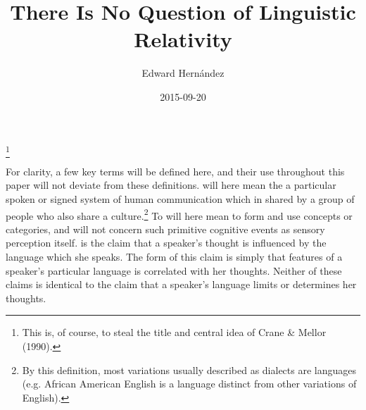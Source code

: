 \documentclass[doc,12pt]{apa6}
\newcommand\blfootnote[1]{%
  \begingroup
  \renewcommand\thefootnote{}\footnote{#1}%
  \addtocounter{footnote}{-1}%
  \endgroup
}
\begin{document}
\title{There Is No Question of Linguistic Relativity}
\author{Edward Hern\'{a}ndez}
\date{2015-09-20}
\maketitle

\blfootnote{This is, of course, to steal the title and central idea of Crane \& Mellor (1990).}
\nocite{Crane90}

For clarity, a few key terms will be defined here, and their use throughout this paper 
will not deviate from these definitions.  will here mean the a particular 
spoken or signed system of human communication which in shared by a group of people who 
also share a culture.\footnote{By this definition, most variations usually described as 
dialects are languages (e.g. African American English is a language distinct from other 
variations of English).} To  will here mean to form and use concepts or 
categories, and will not concern such primitive cognitive events as sensory perception 
itself.  is the claim that a speaker's thought is influenced 
by the language which she speaks. The  form of this claim is simply that 
features of a speaker's particular language is correlated
with her thoughts. Neither of these claims is identical to  
the claim that a speaker's language limits or determines her thoughts.
\end{document}

